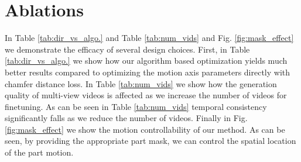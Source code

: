 \section{Ablations} 
In Table \ref{tab:dir_vs_algo.} and Table \ref{tab:num_vids} and Fig. \ref{fig:mask_effect} we demonstrate the efficacy of several design choices. First, in Table \ref{tab:dir_vs_algo.} we show how our algorithm based optimization yields much better results compared to optimizing the motion axis parameters directly with chamfer distance loss. In Table \ref{tab:num_vids} we show how the generation quality of multi-view videos is affected as we increase the number of videos for finetuning. As can be seen in Table \ref{tab:num_vids} temporal consistency significantly falls as we reduce the number of videos. Finally in Fig. \ref{fig:mask_effect} we show the motion controllability of our method. As can be seen, by providing the appropriate part mask, we can control the spatial location of the part motion.


